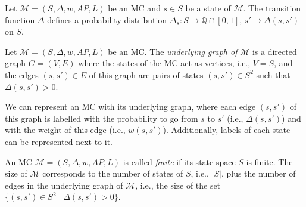 \begin{property}
  Let $\mathcal{M} = (S, \Delta, w, AP, L)$ be an MC and $s \in S$ be a state of $\mathcal{M}$. The transition function $\Delta$ defines a probability distribution $\Delta_s: S \rightarrow \mathbb{Q} \cap [0, 1], \, s' \mapsto \Delta(s, s')$ on $S$.
\end{property}

\begin{definition}
  Let \sloppy $\mathcal{M}=(S, \Delta, w, AP, L)$ be an MC. The \textit{underlying graph of} $\mathcal{M}$ is a directed graph $G = (V, E)$ where the states of the MC act as vertices, i.e., $V = S$, and the edges $(s, s') \in E$ of this graph are pairs of states $(s, s')\in S^2$ such that $\Delta(s, s')>0$.
\end{definition}

We can represent an MC with its underlying graph, where each edge $(s, s')$ of this graph is labelled with the probability to go from $s$ to $s'$ (i.e., $\Delta(s, s')$) and with the weight of this edge (i.e., $w(s, s')$).
Additionally, labels of each
state can be represented next to it.

\begin{notation}
  An MC $\mathcal{M}=(S, \Delta, w, AP, L)$ is called \textit{finite} if its state space $S$ is finite. The size of $\mathcal{M}$ corresponds to the number of states of $S$, i.e., $|S|$, plus
the number of edges in the underlying graph of $\mathcal{M}$, i.e., the size of the set
  $\{(s, s') \in S^2 \; | \; \Delta(s, s') > 0 \}$.
\end{notation}

